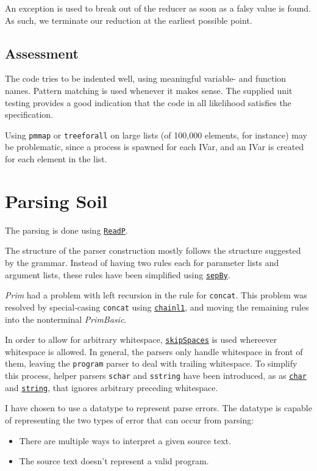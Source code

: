\documentclass[11pt,a4paper]{article}
\newcommand{\hoogle}[1]{\href{http://www.haskell.org/hoogle/?hoogle=#1}
                             {\texttt{#1}}}
\begin{document}
An exception is used to break out of the reducer as soon as a falsy value is
found. As such, we terminate our reduction at the earliest possible point.

\subsection{Assessment}
The code tries to be indented well, using meaningful variable- and function
names. Pattern matching is used whenever it makes sense. The supplied unit
testing provides a good indication that the code in all likelihood satisfies
the specification.

Using \texttt{pmmap} or \texttt{treeforall} on large lists (of 100,000
elements, for instance) may be problematic, since a process is spawned for
each IVar, and an IVar is created for each element in the list.

\section{Parsing Soil}
The parsing is done using \hoogle{ReadP}.

The structure of the parser construction mostly follows the structure
suggested by the grammar. Instead of having two rules each for parameter lists
and argument lists, these rules have been simplified using \hoogle{sepBy}.

\emph{Prim} had a problem with left recursion in the rule for \texttt{concat}. This
problem was resolved by special-casing \texttt{concat} using \hoogle{chainl1}, and
moving the remaining rules into the nonterminal \emph{PrimBasic}.

In order to allow for arbitrary whitespace, \hoogle{skipSpaces} is used whereever
whitespace is allowed. In general, the parsers only handle whitespace in front of
them, leaving the \texttt{program} parser to deal with trailing whitespace.
To simplify this process, helper parsers \texttt{schar} and \texttt{sstring} have
been introduced, as as \hoogle{char} and \hoogle{string}, that ignores arbitrary
preceding whitespace.

I have chosen to use a datatype to represent parse errors. The datatype is capable
of representing the two types of error that can occur from parsing:
\begin{itemize}
    \item There are multiple ways to interpret a given source text.
    \item The source text doesn't represent a valid program.
\end{itemize}
\end{document}
